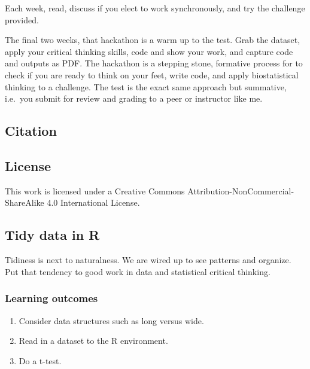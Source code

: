 \documentclass[
]{book}
\providecommand{\tightlist}{%
  \setlength{\itemsep}{0pt}\setlength{\parskip}{0pt}}
\begin{document}
Each week, read, discuss if you elect to work synchronously, and try the challenge provided.

The final two weeks, that hackathon is a warm up to the test. Grab the dataset, apply your critical thinking skills, code and show your work, and capture code and outputs as PDF. The hackathon is a stepping stone, formative process for to check if you are ready to think on your feet, write code, and apply biostatistical thinking to a challenge. The test is the exact same approach but summative, i.e.~you submit for review and grading to a peer or instructor like me.

\hypertarget{citation}{%
\subsection*{Citation}\label{citation}}

\hypertarget{license}{%
\subsection*{License}\label{license}}

This work is licensed under a Creative Commons Attribution-NonCommercial-ShareAlike 4.0 International License.

\hypertarget{tidy-data-in-r}{%
\subsection*{Tidy data in R}\label{tidy-data-in-r}}

Tidiness is next to naturalness. We are wired up to see patterns and organize. Put that tendency to good work in data and statistical critical thinking.

\hypertarget{learning-outcomes-1}{%
\subsubsection*{Learning outcomes}\label{learning-outcomes-1}}

\begin{enumerate}
\def\labelenumi{\arabic{enumi}.}
\tightlist
\item
  Consider data structures such as long versus wide.\\
\item
  Read in a dataset to the R environment.\\
\item
  Do a t-test.
\end{enumerate}
\end{document}
